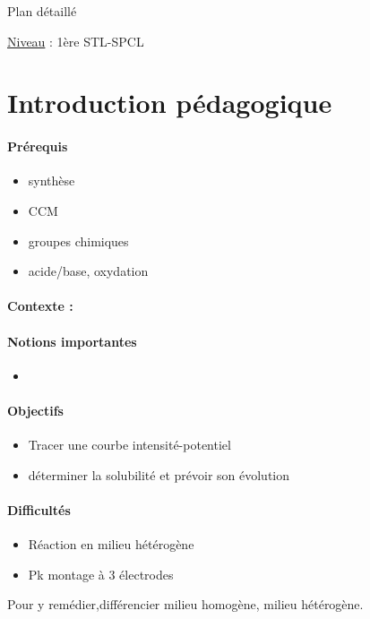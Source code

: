 \begin{reportBlock}{Plan détaillé}

\underline{Niveau} : 1ère STL-SPCL \\

\section*{Introduction pédagogique}


\paragraph*{Prérequis}
\begin{itemize}
\item synthèse
\item CCM
\item groupes chimiques
\item acide/base, oxydation
\end{itemize}
\paragraph*{Contexte :}


\paragraph*{Notions importantes}

\begin{itemize}
\item 
\end{itemize}

\paragraph*{Objectifs}

\begin{itemize}
\item Tracer une courbe intensité-potentiel
\item déterminer la solubilité et prévoir son évolution
\end{itemize}

\paragraph*{Difficultés}

\begin{itemize}
\item Réaction en milieu hétérogène
\item Pk montage à 3 électrodes
\end{itemize}
Pour y remédier,différencier milieu homogène, milieu hétérogène. 

\end{reportBlock}
